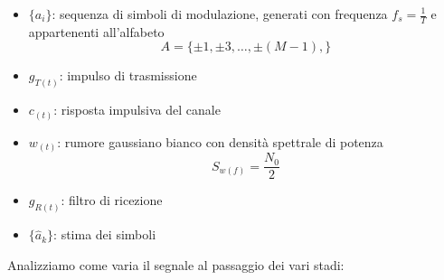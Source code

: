            \begin{itemize}
                \item {$\{a_i\}$: sequenza di simboli di modulazione, generati con frequenza $f_s=\frac{1}{T}$ e appartenenti all'alfabeto
                \[
                    A = \{\pm 1,\pm 3, \dots, \pm (M-1),\}  
                \]}
                \item {$g_{T(t)}$: impulso di trasmissione}
                \item {$c_{(t)}$: risposta impulsiva del canale}
                \item {$w_{(t)}$: rumore gaussiano bianco con densità spettrale di potenza\[
                    S_{w(f)} = \frac{N_0}{2}  
                \]}
                \item {$g_{R(t)}$: filtro di ricezione}
                \item {$\{\hat{a}_k\}$: stima dei simboli}
            \end{itemize}
            Analizziamo come varia il segnale al passaggio dei vari stadi:
